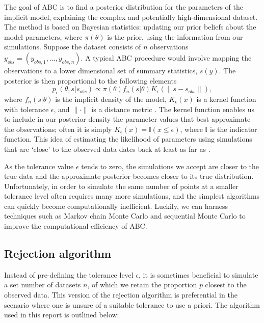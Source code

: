 \documentclass[]{article}
\begin{document}
The goal of ABC is to find a posterior distribution for the parameters of the implicit model, explaining the complex and potentially high-dimensional dataset. The method is based on Bayesian statistics: updating our prior beliefs about the model parameters, where $\pi(\theta)$ is the prior, using the information from our simulations. Suppose the dataset consists of $n$ observations $y_{obs} = (y_{obs,1}, ..., y_{obs,n})$. A typical ABC procedure would involve mapping the observations to a lower dimensional set of summary statistics, $s(y)$. The posterior is then proportional to the following elements
\begin{equation}
p_{\epsilon}(\theta, s|s_{obs}) \propto \pi(\theta)f_n(s|\theta)K_{\epsilon}(\|s - s_{obs}\|),
\end{equation}
where $f_n(s|\theta)$ is the implicit density of the model, $K_{\epsilon}(x)$ is a kernel function with tolerance $\epsilon$, and $\| \cdot \|$ is a distance metric \citep{RN2}. The kernel function enables us to include in our posterior density the parameter values that best approximate the observations; often it is simply $K_{\epsilon}(x) = \mathbb{I}(x \leq \epsilon)$, where $\mathbb{I}$ is the indicator function. This idea of estimating the likelihood of parameters using simulations that are `close' to the observed data dates back at least as far as \cite{RN56}.

As the tolerance value $\epsilon$ tends to zero, the simulations we accept are closer to the true data and the approximate posterior becomes closer to its true distribution. Unfortunately, in order to simulate the same number of points at a smaller tolerance level often requires many more simulations, and the simplest algorithms can quickly become computationally inefficient. Luckily, we can harness techniques such as Markov chain Monte Carlo \citep{RN17, RN27} and sequential Monte Carlo \citep{RN21, RN30, RN22, RN29} to improve the computational efficiency of ABC.

\subsection{Rejection algorithm}
\label{sec1}

Instead of pre-defining the tolerance level $\epsilon$, it is sometimes beneficial to simulate a set number of datasets $n$, of which we retain the proportion $p$ closest to the observed data. This version of the rejection algorithm is preferential in the scenario where one is unsure of a suitable tolerance to use a priori. The algorithm used in this report is outlined below:
\end{document}
